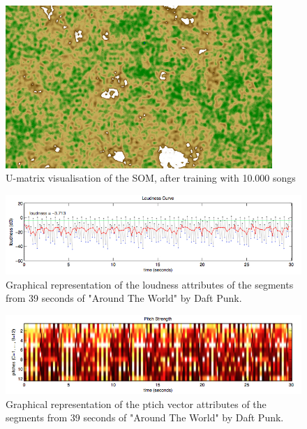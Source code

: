 \begin{figure}[h!]
    \centering
    \includegraphics[angle=90, width=0.9\textwidth]{figures/map.jpg}
    \caption{U-matrix visualisation of the SOM, after training with 10.000 songs}
    \label{fig:map}
\end{figure}


\begin{figure}[h!]
    \centering
    \includegraphics[width=\textwidth]{figures/loudness.jpg}
    \caption{Graphical representation of the loudness attributes of the segments from 39 seconds of "Around The World" by Daft Punk.}
    \label{fig:loudness}
\end{figure}

\vspace{2cm}

\begin{figure}[h!]
    \centering
    \includegraphics[width=\textwidth]{figures/pitch.jpg}
    \caption{Graphical representation of the ptich vector attributes of the segments from 39 seconds of "Around The World" by Daft Punk.}
    \label{fig:pitch}
\end{figure}

